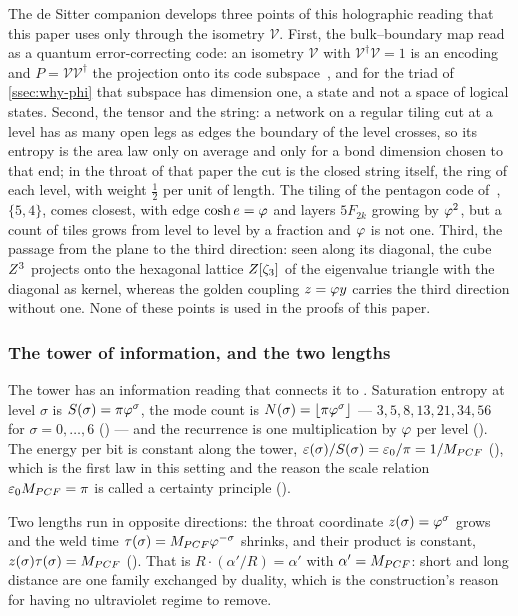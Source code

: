 The de Sitter companion develops three points of this holographic reading that this paper uses only through the
isometry $\mathcal V$.  First, the bulk--boundary map read as a quantum error-correcting code: an isometry $\mathcal V$ with
$\mathcal V^\dagger\mathcal V=1$ is an encoding and $P=\mathcal V\mathcal V^\dagger$ the projection onto its code subspace~\cite{almheiri15,pastawski15},
and for the triad of \cref{ssec:why-phi} that subspace has dimension one, a state and not a space of logical
states.  Second, the tensor and the string: a network on a regular tiling cut at a level has as many open legs as
edges the boundary of the level crosses, so its entropy is the area law only on average and only for a bond
dimension chosen to that end; in the throat of that paper the cut is the closed string itself, the ring of each
level, with weight $\tfrac12$ per unit of length.  The tiling of the pentagon code of~\cite{pastawski15}, $\{5,4\}$,
comes closest, with edge $\cosh e=\varphi$ and layers $5F_{2k}$ growing by $\varphi^2$, but a count of tiles grows
from level to level by a fraction and $\varphi$ is not one.  Third, the passage from the plane to the third
direction: seen along its diagonal, the cube $Z^3$ projects onto the hexagonal lattice $Z[\zeta_3]$ of the
eigenvalue triangle with the diagonal as kernel, whereas the golden coupling $z=\varphi y$ carries the third
direction without one.  None of these points is used in the proofs of this paper.

\subsubsection{The tower of information, and the two lengths}\label{sec:tower-info}

The tower has an information reading that connects it to .  Saturation
entropy at level $\sigma$ is $S(\sigma)=\pi\varphi^{\sigma}$, the mode count is
$N(\sigma)=\lfloor\pi\varphi^\sigma\rfloor$ --- $3,5,8,13,21,34,56$ for
$\sigma=0,\dots,6$  () --- and the recurrence is
one multiplication by $\varphi$ per level 
().  The energy per bit is constant along
the tower, $\varepsilon(\sigma)/S(\sigma)=\varepsilon_{0}/\pi=1/M_{PCF}$ 
(), which is the first law in this setting
and the reason the scale relation $\varepsilon_{0}M_{PCF}=\pi$ is called a certainty
principle  ().

Two lengths run in opposite directions: the throat coordinate
$z(\sigma)=\varphi^{\sigma}$ grows and the weld time
$\tau(\sigma)=M_{PCF}\varphi^{-\sigma}$ shrinks, and their product is constant,
$z(\sigma)\tau(\sigma)=M_{PCF}$  ().
That is $R\cdot(\alpha'/R)=\alpha'$ with $\alpha'=M_{PCF}$: short and long distance
are one family exchanged by duality, which is the construction's reason for
having no ultraviolet regime to remove.

